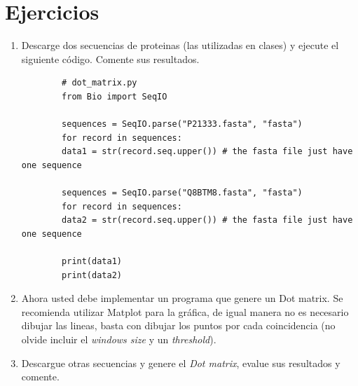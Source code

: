 \documentclass{article}
\begin{document}
	\section{Ejercicios}\label{sec:ejercicios}
	\begin{enumerate}
		\item Descarge dos secuencias de proteinas (las utilizadas en clases) y ejecute el siguiente código. Comente sus resultados.
		\begin{lstlisting}
		# dot_matrix.py
		from Bio import SeqIO
		
		sequences = SeqIO.parse("P21333.fasta", "fasta")
		for record in sequences:
		data1 = str(record.seq.upper()) # the fasta file just have one sequence 
		
		sequences = SeqIO.parse("Q8BTM8.fasta", "fasta")
		for record in sequences:
		data2 = str(record.seq.upper()) # the fasta file just have one sequence  
		
		print(data1)
		print(data2)
		\end{lstlisting}
		
		\item Ahora usted debe implementar un programa que genere un Dot matrix. Se recomienda utilizar Matplot para la gráfica, de igual manera no es necesario dibujar las lineas, basta con dibujar los puntos por cada coincidencia (no olvide incluir el \textit{windows size} y un \textit{threshold}).
		
		\item Descargue otras secuencias y genere el \textit{Dot matrix}, evalue sus resultados y comente.
	\end{enumerate}
	
	
	
\end{document}
